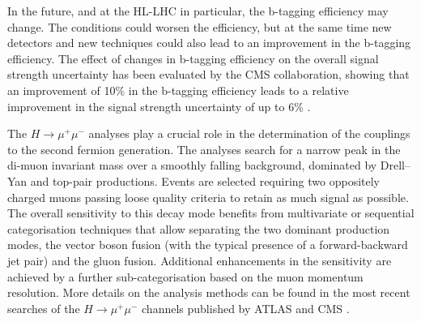 In the future, and at the HL-LHC in particular, the b-tagging efficiency may change. The conditions could worsen the efficiency, but
at the same time new detectors and new techniques could also lead to an improvement in the b-tagging efficiency. 
The effect of changes in b-tagging efficiency on the overall signal strength uncertainty has been evaluated by the CMS collaboration, showing that an improvement of 10\% in the b-tagging efficiency leads to a relative improvement in the signal strength uncertainty of up to 6\% \cite{CMS-PAS-FTR-18-011}.
%


\label{Sec:2.3.8}
The  $H \to \mu^{+}\mu^{-}$ analyses play a crucial role in the determination of the couplings to the second fermion generation. The analyses search for a narrow peak in the di-muon invariant mass over a smoothly falling background, dominated by Drell--Yan and top-pair productions. Events are selected requiring two oppositely charged muons passing loose quality criteria to retain as much signal as possible. The overall sensitivity to this decay mode benefits from multivariate or sequential categorisation techniques that allow separating the two dominant production modes, the vector boson fusion (with the typical presence of a forward-backward jet pair) and the gluon fusion. Additional enhancements in the sensitivity are achieved by a further sub-categorisation based on the muon momentum resolution. More details on the analysis methods can be found in the most recent searches of the  $H \to \mu^{+}\mu^{-}$ channels published by ATLAS \cite{Aaboud:2017ojs} and CMS \cite{Sirunyan:2018hbu}.  

